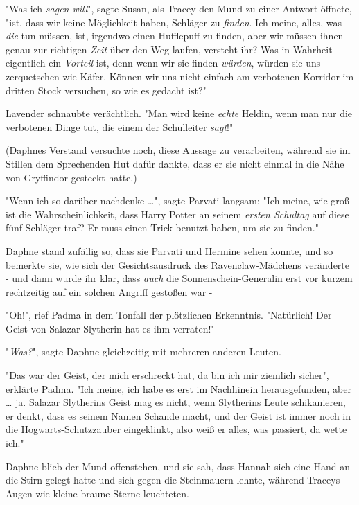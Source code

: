 {"Was ich \emph{sagen will}", sagte Susan, als Tracey den Mund zu einer Antwort öffnete, "ist, dass wir keine Möglichkeit haben, Schläger zu \emph{finden}. Ich meine, alles, was \emph{die} tun müssen, ist, irgendwo einen Hufflepuff zu finden, aber wir müssen ihnen genau zur richtigen \emph{Zeit} über den Weg laufen, versteht ihr? Was in Wahrheit eigentlich ein \emph{Vorteil} ist, denn wenn wir sie finden \emph{würden}, würden sie uns zerquetschen wie Käfer. Können wir uns nicht einfach am verbotenen Korridor im dritten Stock versuchen, so wie es gedacht ist?"

Lavender schnaubte verächtlich. "Man wird keine \emph{echte} Heldin, wenn man nur die verbotenen Dinge tut, die einem der Schulleiter \emph{sagt}!"

(Daphnes Verstand versuchte noch, diese Aussage zu verarbeiten, während sie im Stillen dem Sprechenden Hut dafür dankte, dass er sie nicht einmal in die Nähe von Gryffindor gesteckt hatte.)

"Wenn ich so darüber nachdenke …", sagte Parvati langsam: "Ich meine, wie groß ist die Wahrscheinlichkeit, dass Harry Potter an seinem \emph{ersten Schultag} auf diese fünf Schläger traf? Er muss einen Trick benutzt haben, um sie zu finden."

Daphne stand zufällig so, dass sie Parvati und Hermine sehen konnte, und so bemerkte sie, wie sich der Gesichtsausdruck des Ravenclaw-Mädchens veränderte - und dann wurde ihr klar, dass \emph{auch} die Sonnenschein-Generalin erst vor kurzem rechtzeitig auf ein solchen Angriff gestoßen war -

"Oh!", rief Padma in dem Tonfall der plötzlichen Erkenntnis. "Natürlich! Der Geist von Salazar Slytherin hat es ihm verraten!"

"\emph{Was?}", sagte Daphne gleichzeitig mit mehreren anderen Leuten.

"Das war der Geist, der mich erschreckt hat, da bin ich mir ziemlich sicher", erklärte Padma. "Ich meine, ich habe es erst im Nachhinein herausgefunden, aber … ja. Salazar Slytherins Geist mag es nicht, wenn Slytherins Leute schikanieren, er denkt, dass es seinem Namen Schande macht, und der Geist ist immer noch in die Hogwarts-Schutzzauber eingeklinkt, also weiß er alles, was passiert, da wette ich."

Daphne blieb der Mund offenstehen, und sie sah, dass Hannah sich eine Hand an die Stirn gelegt hatte und sich gegen die Steinmauern lehnte, während Traceys Augen wie kleine braune Sterne leuchteten.

}
